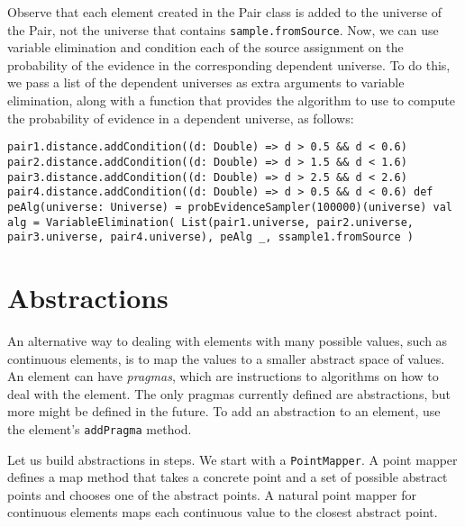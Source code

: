 Observe that each element created in the Pair class is added to the universe of the Pair, not the universe that contains \texttt{sample.fromSource}. Now, we can use variable elimination and condition each of the source assignment on the probability of the evidence in the corresponding dependent universe. To do this, we pass a list of the dependent universes as extra arguments to variable elimination, along
with a function that provides the algorithm to use to compute the probability of evidence in a dependent universe, as follows:

\begin{flushleft}
\texttt{pair1.distance.addCondition((d: Double) => d > 0.5 \&\& d < 0.6) 
\newline pair2.distance.addCondition((d: Double) => d > 1.5 \&\& d < 1.6) 
\newline pair3.distance.addCondition((d: Double) => d > 2.5 \&\& d < 2.6) 
\newline pair4.distance.addCondition((d: Double) => d > 0.5 \&\& d < 0.6)
\newline 
\newline def peAlg(universe: Universe) =
\newline \tab probEvidenceSampler(100000)(universe)
\newline val alg = VariableElimination(
\newline \tab List(pair1.universe, pair2.universe, pair3.universe, pair4.universe),
\newline peAlg \_, ssample1.fromSource
\newline )
}
\end{flushleft}


\section{Abstractions}

An alternative way to dealing with elements with many possible values, such as continuous elements, is to map the values to a smaller abstract space of values. An element can have \emph{pragmas}, which are instructions to algorithms on how to deal with the element. The only pragmas currently defined are abstractions, but more might be defined in the future. To add an abstraction to an element, use the element's \texttt{addPragma} method.

Let us build abstractions in steps. We start with a \texttt{PointMapper}. A point mapper defines a map method that takes a concrete point and a set of possible abstract points and chooses one of the abstract points. A natural point mapper for continuous elements maps each continuous value to the closest abstract point.

